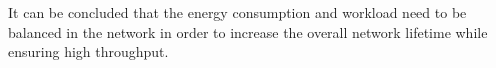 It can be concluded that the energy consumption and workload need to be balanced in the network in order to increase the overall network lifetime while ensuring high throughput. 







